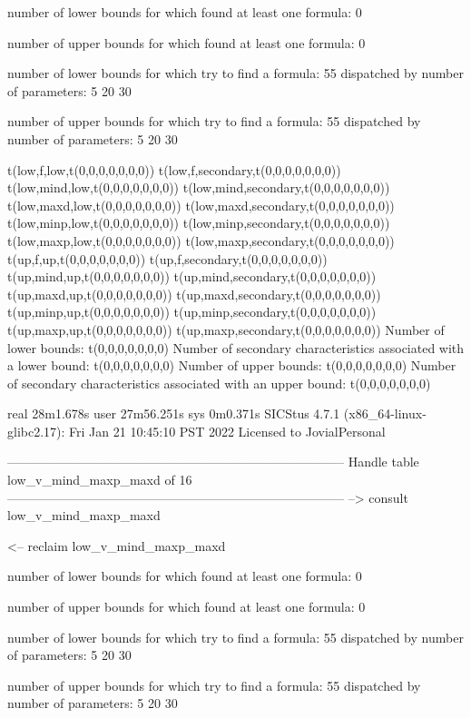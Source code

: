 number of lower bounds for which found at least one formula: 0

number of upper bounds for which found at least one formula: 0

number of lower bounds for which try to find a formula: 55
dispatched by number of parameters: 5  20  30

number of upper bounds for which try to find a formula: 55
dispatched by number of parameters: 5  20  30

t(low,f,low,t(0,0,0,0,0,0,0))
t(low,f,secondary,t(0,0,0,0,0,0,0))
t(low,mind,low,t(0,0,0,0,0,0,0))
t(low,mind,secondary,t(0,0,0,0,0,0,0))
t(low,maxd,low,t(0,0,0,0,0,0,0))
t(low,maxd,secondary,t(0,0,0,0,0,0,0))
t(low,minp,low,t(0,0,0,0,0,0,0))
t(low,minp,secondary,t(0,0,0,0,0,0,0))
t(low,maxp,low,t(0,0,0,0,0,0,0))
t(low,maxp,secondary,t(0,0,0,0,0,0,0))
t(up,f,up,t(0,0,0,0,0,0,0))
t(up,f,secondary,t(0,0,0,0,0,0,0))
t(up,mind,up,t(0,0,0,0,0,0,0))
t(up,mind,secondary,t(0,0,0,0,0,0,0))
t(up,maxd,up,t(0,0,0,0,0,0,0))
t(up,maxd,secondary,t(0,0,0,0,0,0,0))
t(up,minp,up,t(0,0,0,0,0,0,0))
t(up,minp,secondary,t(0,0,0,0,0,0,0))
t(up,maxp,up,t(0,0,0,0,0,0,0))
t(up,maxp,secondary,t(0,0,0,0,0,0,0))
Number of lower bounds:                                             t(0,0,0,0,0,0,0)
Number of secondary characteristics associated with a lower bound:  t(0,0,0,0,0,0,0)
Number of upper bounds:                                             t(0,0,0,0,0,0,0)
Number of secondary characteristics associated with an upper bound: t(0,0,0,0,0,0,0)

real	28m1.678s
user	27m56.251s
sys	0m0.371s
SICStus 4.7.1 (x86_64-linux-glibc2.17): Fri Jan 21 10:45:10 PST 2022
Licensed to JovialPersonal


--------------------------------------------------------------------------------
Handle table low_v_mind_maxp_maxd of 16
--------------------------------------------------------------------------------
--> consult low_v_mind_maxp_maxd

<-- reclaim low_v_mind_maxp_maxd

number of lower bounds for which found at least one formula: 0

number of upper bounds for which found at least one formula: 0

number of lower bounds for which try to find a formula: 55
dispatched by number of parameters: 5  20  30

number of upper bounds for which try to find a formula: 55
dispatched by number of parameters: 5  20  30

